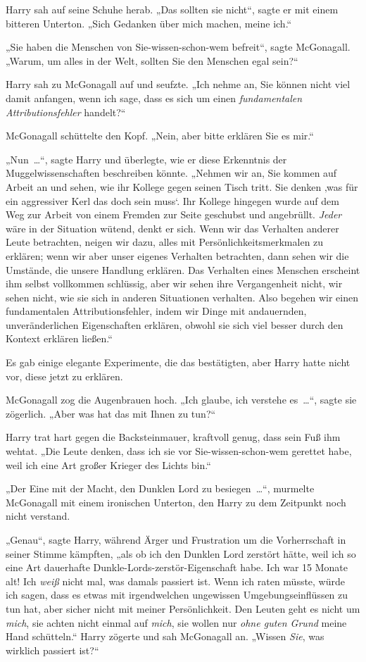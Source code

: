 {Harry sah auf seine Schuhe herab. „Das sollten sie nicht“, sagte er mit einem bitteren Unterton. „Sich Gedanken über mich machen, meine ich.“

„Sie haben die Menschen von Sie-wissen-schon-wem befreit“, sagte McGonagall. „Warum, um alles in der Welt, sollten Sie den Menschen egal sein?“

Harry sah zu McGonagall auf und seufzte. „Ich nehme an, Sie können nicht viel damit anfangen, wenn ich sage, dass es sich um einen \emph{fundamentalen Attributionsfehler} handelt?“

McGonagall schüttelte den Kopf. „Nein, aber bitte erklären Sie es mir.“

„Nun~…“, sagte Harry und überlegte, wie er diese Erkenntnis der Muggelwissenschaften beschreiben könnte. „Nehmen wir an, Sie kommen auf Arbeit an und sehen, wie ihr Kollege gegen seinen Tisch tritt. Sie denken ‚was für ein aggressiver Kerl das doch sein muss`. Ihr Kollege hingegen wurde auf dem Weg zur Arbeit von einem Fremden zur Seite geschubst und angebrüllt. \emph{Jeder} wäre in der Situation wütend, denkt er sich. Wenn wir das Verhalten anderer Leute betrachten, neigen wir dazu, alles mit Persönlichkeitsmerkmalen zu erklären; wenn wir aber unser eigenes Verhalten betrachten, dann sehen wir die Umstände, die unsere Handlung erklären. Das Verhalten eines Menschen erscheint ihm selbst vollkommen schlüssig, aber wir sehen ihre Vergangenheit nicht, wir sehen nicht, wie sie sich in anderen Situationen verhalten. Also begehen wir einen fundamentalen Attributionsfehler, indem wir Dinge mit andauernden, unveränderlichen Eigenschaften erklären, obwohl sie sich viel besser durch den Kontext erklären ließen.“

Es gab einige elegante Experimente, die das bestätigten, aber Harry hatte nicht vor, diese jetzt zu erklären.

McGonagall zog die Augenbrauen hoch. „Ich glaube, ich verstehe es~…“, sagte sie zögerlich. „Aber was hat das mit Ihnen zu tun?“

Harry trat hart gegen die Backsteinmauer, kraftvoll genug, dass sein Fuß ihm wehtat. „Die Leute denken, dass ich sie vor Sie-wissen-schon-wem gerettet habe, weil ich eine Art großer Krieger des Lichts bin.“

„Der Eine mit der Macht, den Dunklen Lord zu besiegen~…“, murmelte McGonagall mit einem ironischen Unterton, den Harry zu dem Zeitpunkt noch nicht verstand.

„Genau“, sagte Harry, während Ärger und Frustration um die Vorherrschaft in seiner Stimme kämpften, „als ob ich den Dunklen Lord zerstört hätte, weil ich so eine Art dauerhafte Dunkle-Lords-zerstör-Eigenschaft habe. Ich war 15 Monate alt! Ich \emph{weiß} nicht mal, was damals passiert ist. Wenn ich raten müsste, würde ich sagen, dass es etwas mit irgendwelchen ungewissen Umgebungseinflüssen zu tun hat, aber sicher nicht mit meiner Persönlichkeit. Den Leuten geht es nicht um \emph{mich}, sie achten nicht einmal auf \emph{mich}, sie wollen nur \emph{ohne guten Grund} meine Hand schütteln.“ Harry zögerte und sah McGonagall an. „Wissen \emph{Sie}, was wirklich passiert ist?“

}
